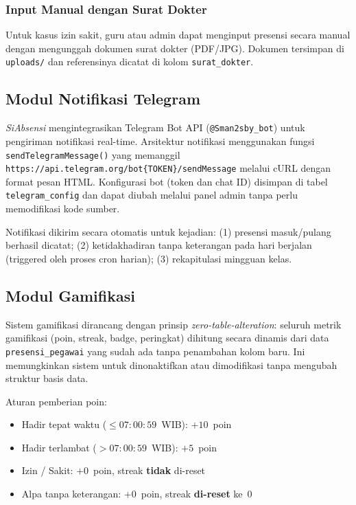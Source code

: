 \documentclass[12pt,a4paper]{article}
\newcommand{\sistem}{\textit{SiAbsensi}}
\begin{document}
\subsubsection{Input Manual dengan Surat Dokter}

Untuk kasus izin sakit, guru atau admin dapat menginput presensi
secara manual dengan mengunggah dokumen surat dokter (PDF/JPG).
Dokumen tersimpan di \texttt{uploads/} dan referensinya dicatat
di kolom \texttt{surat\_dokter}.

\subsection{Modul Notifikasi Telegram}

\sistem{} mengintegrasikan Telegram Bot API (\texttt{@Sman2sby\_bot})
untuk pengiriman notifikasi real-time.
Arsitektur notifikasi menggunakan fungsi \texttt{sendTelegramMessage()}
yang memanggil \texttt{https://api.telegram.org/bot\{TOKEN\}/sendMessage}
melalui cURL dengan format pesan HTML.
Konfigurasi bot (token dan chat ID) disimpan di tabel
\texttt{telegram\_config} dan dapat diubah melalui panel admin tanpa
perlu memodifikasi kode sumber.

Notifikasi dikirim secara otomatis untuk kejadian:
(1) presensi masuk/pulang berhasil dicatat;
(2) ketidakhadiran tanpa keterangan pada hari berjalan (triggered
oleh proses cron harian);
(3) rekapitulasi mingguan kelas.

\subsection{Modul Gamifikasi}

Sistem gamifikasi dirancang dengan prinsip \textit{zero-table-alteration}:
seluruh metrik gamifikasi (poin, streak, badge, peringkat) dihitung
secara dinamis dari data \texttt{presensi\_pegawai} yang sudah ada
tanpa penambahan kolom baru.
Ini memungkinkan sistem untuk dinonaktifkan atau dimodifikasi tanpa
mengubah struktur basis data.

Aturan pemberian poin:
\begin{itemize}
  \item Hadir tepat waktu ($\leq 07:00:59$~WIB): $+10$~poin
  \item Hadir terlambat ($> 07:00:59$~WIB): $+5$~poin
  \item Izin / Sakit: $+0$~poin, streak \textbf{tidak} di-reset
  \item Alpa tanpa keterangan: $+0$~poin, streak \textbf{di-reset} ke~0
\end{itemize}
\end{document}
